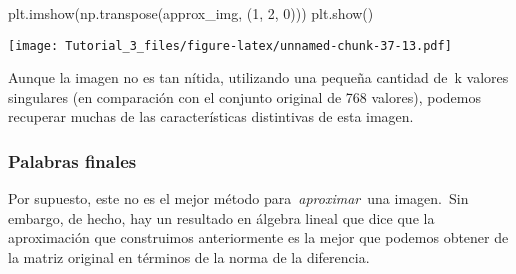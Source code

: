 \documentclass[
]{article}
\newenvironment{Shaded}{\begin{snugshade}}{\end{snugshade}}
\newcommand{\DecValTok}[1]{\textcolor[rgb]{0.00,0.00,0.81}{#1}}
\newcommand{\NormalTok}[1]{#1}
\begin{document}
\begin{Shaded}
\begin{Highlighting}[]
\NormalTok{plt.imshow(np.transpose(approx\_img, (}\DecValTok{1}\NormalTok{, }\DecValTok{2}\NormalTok{, }\DecValTok{0}\NormalTok{)))}
\NormalTok{plt.show()}
\end{Highlighting}
\end{Shaded}

\texttt{[image: Tutorial\_3\_files/figure-latex/unnamed-chunk-37-13.pdf]}

Aunque la imagen no es tan nítida, utilizando una pequeña cantidad de~k
valores singulares (en comparación con el conjunto original de 768
valores), podemos recuperar muchas de las características distintivas de
esta imagen.

\hypertarget{palabras-finales}{%
\subsubsection{Palabras finales}\label{palabras-finales}}

Por supuesto, este no es el mejor método para~\emph{aproximar}~una
imagen.~Sin embargo, de hecho, hay un resultado en álgebra lineal que
dice que la aproximación que construimos anteriormente es la mejor que
podemos obtener de la matriz original en términos de la norma de la
diferencia.
\end{document}
